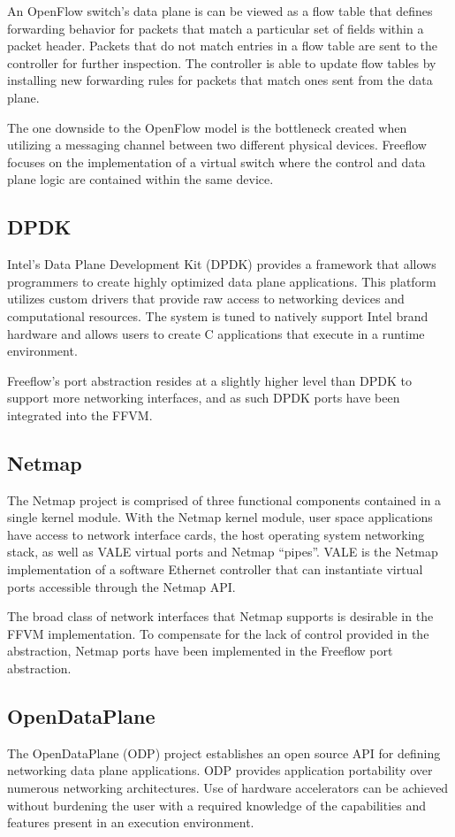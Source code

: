 An OpenFlow switch's data plane is can be viewed as a flow table that defines
forwarding behavior for packets that match a particular set of fields within
a packet header. Packets that do not match entries in a flow table are sent
to the controller for further inspection. The controller is able to update flow
tables by installing new forwarding rules for packets that match ones sent
from the data plane.

The one downside to the OpenFlow model is the bottleneck created when utilizing
a messaging channel between two different physical devices. Freeflow focuses
on the implementation of a virtual switch where the control and data plane
logic are contained within the same device.

\subsection{DPDK}
\label{related:dpdk}
Intel's Data Plane Development Kit (DPDK) \cite{dpdk} provides a framework that
allows programmers to create highly optimized data plane applications. This
platform utilizes custom drivers that provide raw access to networking devices
and computational resources. The system is tuned to natively support Intel
brand hardware and allows users to create C applications that execute in
a runtime environment.

Freeflow's port abstraction resides at a slightly higher level than DPDK to
support more networking interfaces, and as such DPDK ports have been integrated
into the FFVM.

\subsection{Netmap}
\label{related:netmap}
The Netmap project \cite{netmap} is comprised of three functional components
contained in a single kernel module. With the Netmap kernel module, user space
applications have access to network interface cards, the host operating system
networking stack, as well as VALE virtual ports and Netmap ``pipes''. VALE is
the Netmap implementation of a software Ethernet controller that can instantiate
virtual ports accessible through the Netmap API.

The broad class of network interfaces that Netmap supports is desirable in the
FFVM implementation. To compensate for the lack of control provided in the
abstraction, Netmap ports have been implemented in the Freeflow port abstraction.

\subsection{OpenDataPlane}
\label{related:odp}
The OpenDataPlane (ODP) project \cite{odp} establishes an open source API for
defining networking data plane applications. ODP provides application
portability over numerous networking architectures. Use of hardware
accelerators can be achieved without burdening the user with a required
knowledge of the capabilities and features present in an execution environment.

